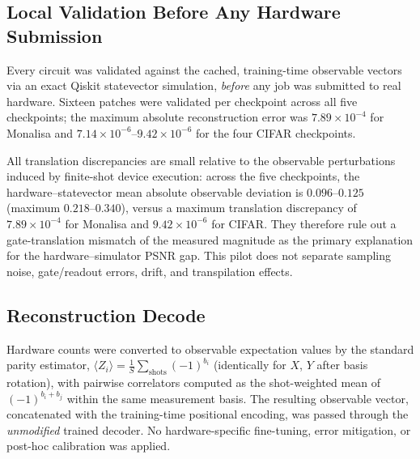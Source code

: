 \documentclass[11pt]{article}
\DeclareRobustCommand{\blue}[1]{\leavevmode{\color{blue}#1}}
\begin{document}
\subsection{Local Validation Before Any Hardware Submission}
Every circuit was validated against the cached, training-time observable vectors via an exact Qiskit statevector simulation, \emph{before} any job was submitted to real hardware. Sixteen patches were validated per checkpoint across all five checkpoints; the maximum absolute reconstruction error was $7.89\times10^{-4}$ for Monalisa \blue{(PCAE1D)} and $7.14\times10^{-6}$--$9.42\times10^{-6}$ for the four CIFAR \blue{PCAE2D} checkpoints.

All translation discrepancies are small relative to the observable perturbations induced by finite-shot device execution: across the five checkpoints, the hardware--statevector mean absolute observable deviation is $0.096$--$0.125$ (maximum $0.218$--$0.340$), versus a maximum translation discrepancy of $7.89\times10^{-4}$ for Monalisa and $9.42\times10^{-6}$ for CIFAR. They therefore rule out a gate-translation mismatch of the measured magnitude as the primary explanation for the hardware--simulator PSNR gap. This pilot does not separate sampling noise, gate/readout errors, drift, and transpilation effects.

\subsection{Reconstruction Decode}
Hardware counts were converted to observable expectation values by the standard parity estimator, $\langle Z_i\rangle = \frac{1}{S}\sum_{\text{shots}} (-1)^{b_i}$ (identically for $X$, $Y$ after basis rotation), with pairwise correlators computed as the shot-weighted mean of $(-1)^{b_i+b_j}$ within the same measurement basis. The resulting observable vector, concatenated with the training-time positional encoding, was passed through the \emph{unmodified} trained decoder. No hardware-specific fine-tuning, error mitigation, or post-hoc calibration was applied.
\end{document}
